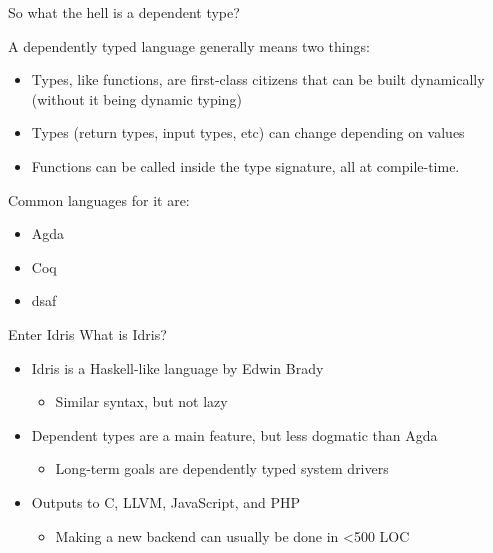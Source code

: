 \documentclass{beamer}
\begin{document}
\begin{frame}{So what the hell is a dependent type? }
	\transdissolve[duration=0.3]

	A dependently typed language generally means two things:
	\begin{itemize}	
		\pause
		\item Types, like functions, are first-class citizens that can be built dynamically (without it being dynamic typing)
		\pause
		\item Types (return types, input types, etc) can change depending on values
			\pause
			\item Functions can be called inside the type signature, all at compile-time.
			\pause
	\end{itemize}

	Common languages for it are: 
	\begin{itemize}	
		\item Agda
		\item Coq 
		\item dsaf
	\end{itemize}
\end{frame}
\begin{frame}{Enter Idris}
	\transdissolve[duration=0.3]
	What is Idris? 
	\begin{itemize}
		\pause
		\item Idris is a Haskell-like language by Edwin Brady \begin{itemize}
				\item Similar syntax, but not lazy
	\end{itemize}
	\pause
     \item Dependent types are a main feature, but less dogmatic than Agda \begin{itemize}
		\item Long-term goals are dependently typed system drivers
	\end{itemize}
		\pause
		\item Outputs to C, LLVM, JavaScript, and PHP \begin{itemize}
				\item Making a new backend can usually be done in \textless 500 LOC
			\end{itemize}
	\end{itemize}
\end{frame}
\end{document}
